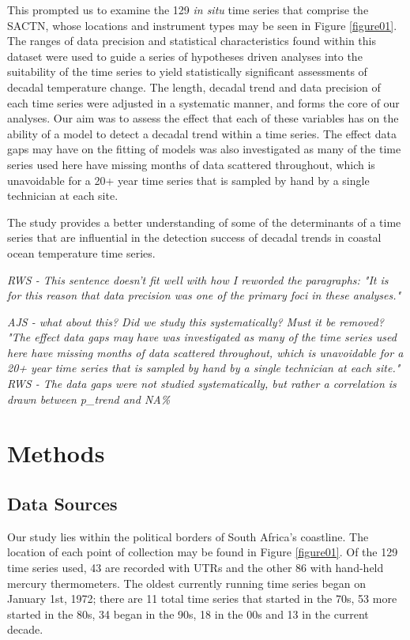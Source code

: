 \documentclass{ametsoc}
\begin{document}
This prompted us to examine the 129 \emph{in situ} time series that comprise the SACTN, whose locations and instrument types may be seen in Figure \ref{figure01}. The ranges of data precision and statistical characteristics found within this dataset were used to guide a series of hypotheses driven analyses into the suitability of the time series to yield statistically significant assessments of decadal temperature change. The length, decadal trend and data precision of each time series were adjusted in a systematic manner, and forms the core of our analyses. Our aim was to assess the effect that each of these variables has on the ability of a model to detect a decadal trend within a time series. The effect data gaps may have on the fitting of models was also investigated as many of the time series used here have missing months of data scattered throughout, which is unavoidable for a 20+ year time series that is sampled by hand by a single technician at each site.

The study provides a better understanding of some of the determinants of a time series that are influential in the detection success of decadal trends in coastal ocean temperature time series.

\emph{RWS - This sentence doesn't fit well with how I reworded the paragraphs: "It is for this reason that data precision was one of the primary foci in these analyses."}

\emph{AJS - what about this? Did we study this systematically? Must it be removed? "The effect data gaps may have was investigated as many of the time series used here have missing months of data scattered throughout, which is unavoidable for a 20+ year time series that is sampled by hand by a single technician at each site."}
\emph{RWS - The data gaps were not studied systematically, but rather a correlation is drawn between p_trend and NA\%}

\section{Methods}

\subsection{Data Sources}
Our study lies within the political borders of South Africa's coastline. The location of each point of collection may be found in Figure \ref{figure01}. Of the 129 time series used, 43 are recorded with UTRs and the other 86 with hand-held mercury thermometers. The oldest currently running time series began on January 1st, 1972; there are 11 total time series that started in the 70s, 53 more started in the 80s, 34 began in the 90s, 18 in the 00s and 13 in the current decade.
\end{document}
